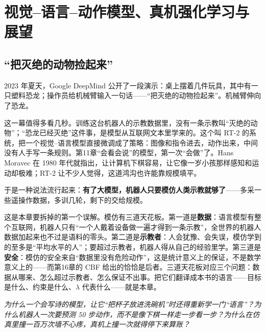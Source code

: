 \chapter{视觉--语言--动作模型、真机强化学习与展望}

\section*{“把灭绝的动物捡起来”}

2023 年夏天，Google DeepMind 公开了一段演示：桌上摆着几件玩具，其中有一只塑料恐龙；操作员给机械臂输入一句话——“把灭绝的动物捡起来”。机械臂伸向了恐龙。

这一幕值得多看几秒。训练这台机器人的示教数据里，没有一条示教叫“灭绝的动物”；“恐龙已经灭绝”这件事，是模型从互联网文本里学来的。这个叫 RT-2 的系统，把一个视觉--语言模型直接微调成了策略：图像和指令进去，动作出来，中间没有人手写一条规则。第11章“会看会说”的模型，第一次“会做”了。Hans Moravec 在 1980 年代就指出，让计算机下棋容易，让它像一岁小孩那样感知和运动却极难；RT-2 让不少人觉得，这道鸿沟也许能靠规模填平。

于是一种说法流行起来：\textbf{有了大模型，机器人只要模仿人类示教就够了}——多采一些遥操作数据，多训几轮，剩下的交给规模。

这是本章要拆掉的第一个误解。模仿有三道天花板。第一道是\textbf{数据}：语言模型有整个互联网，机器人只有“一个人戴着设备做一遍才得到一条示教”，全世界的机器人数据加起来也不过是语料的零头。第二道是\textbf{示教者}：人会犹豫、会失误，模仿学到的至多是“平均水平的人”；要超过示教者，机器人得从自己的经验里学。第三道是\textbf{安全}：模仿的安全来自“数据里没有危险动作”，这是统计意义上的保证，不是数学意义上的——而第16章的 CBF 给出的恰恰是后者。三道天花板对应三个问题：数据从哪来、怎么超过示教者、怎么保证不出事。把它们翻译成本书的语言——目标是什么、约束是什么、$\lambda$ 代表什么——就是本章。

\vspace{0.3cm}
\noindent\textit{为什么一个会写诗的模型，让它“把杯子放进洗碗机”时还得重新学一门“语言”？为什么机器人一次要预测 50 步动作，而不是像下棋一样走一步看一步？为什么在仿真里撞一百万次墙不心疼，真机上撞一次就得停下来算账？}

